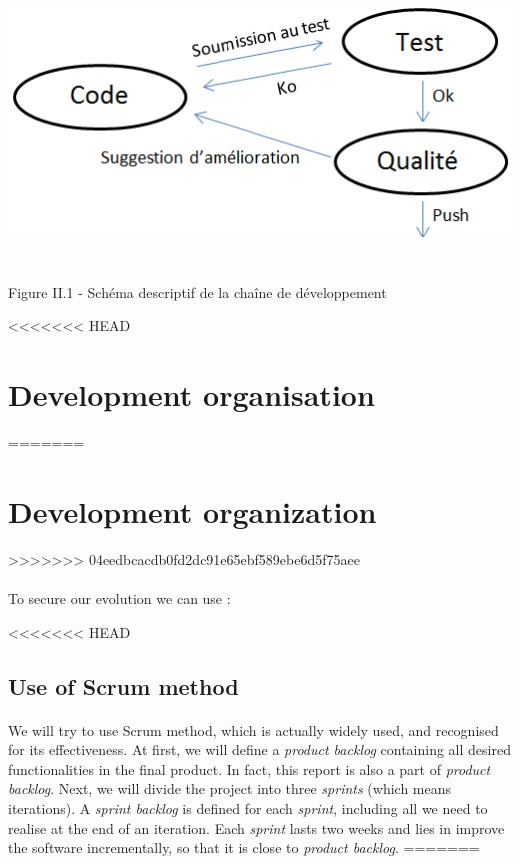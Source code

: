 \documentclass{report}
\begin{document}
\begin{center}
\includegraphics[scale=0.7]{data/cycle_qualite}
~\\~\\Figure II.1 - Sch\'{e}ma descriptif de la cha\^{i}ne de d\'{e}veloppement
\end{center}

<<<<<<< HEAD
\section{Development organisation}
=======
\section{Development organization}
>>>>>>> 04eedbcacdb0fd2dc91e65ebf589ebe6d5f75aee

\paragraph{}
\hspace{4mm}\textnormal{To secure our evolution we can use :}

<<<<<<< HEAD
\subsection{Use of Scrum method}

\paragraph{}
\hspace{4mm}\textnormal{We will try to use Scrum method, which is actually widely used, and 
recognised for its effectiveness. At first, we will define a 
\textit{product backlog} containing all desired functionalities in 
the final product. In fact, this report is also a part of \textit{product backlog}. Next, we will divide the project into 
three \textit{sprints} (which means iterations). A \textit{sprint backlog} is defined for each \textit{sprint}, including all we need 
to realise at the end of an iteration. Each \textit{sprint} lasts two weeks and lies in improve the software incrementally, so that it 
is close to \textit{product backlog}.}
=======
\end{document}
